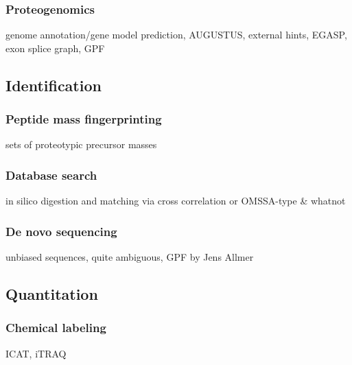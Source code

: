 \subsubsection{Proteogenomics}

\begin{todo}
genome annotation/gene model prediction, AUGUSTUS, external hints, 
EGASP, exon splice graph, GPF
\end{todo}

\subsection{Identification}

\subsubsection{Peptide mass fingerprinting}

\citep{Pappin1993,Henzel1993,Mann1993,James1993,Yates1993}

\begin{todo}
sets of proteotypic precursor masses
\end{todo}

\subsubsection{Database search}

\begin{todo}
in silico digestion and matching via cross correlation or OMSSA-type & whatnot
\end{todo}

\subsubsection{De novo sequencing}

\begin{todo}
unbiased sequences, quite ambiguous, GPF by Jens Allmer
\end{todo}

\subsection{Quantitation}

\subsubsection{Chemical labeling}
 
\begin{todo}
ICAT, iTRAQ
\end{todo}

